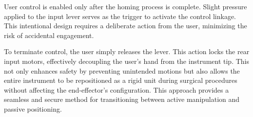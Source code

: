 User control is enabled only after the homing process is complete. Slight pressure applied to the input lever serves as the trigger to activate the control linkage. This intentional design requires a deliberate action from the user, minimizing the risk of accidental engagement.

To terminate control, the user simply releases the lever. This action locks the rear input motors, effectively decoupling the user's hand from the instrument tip. This not only enhances safety by preventing unintended motions but also allows the entire instrument to be repositioned as a rigid unit during surgical procedures without affecting the end-effector's configuration. This approach provides a seamless and secure method for transitioning between active manipulation and passive positioning.